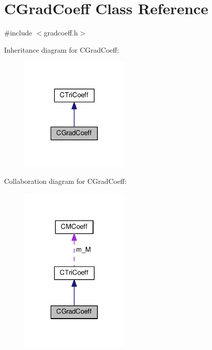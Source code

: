 \hypertarget{classCGradCoeff}{\section{C\-Grad\-Coeff Class Reference}
\label{classCGradCoeff}
}


{\ttfamily \#include $<$gradcoeff.\-h$>$}



Inheritance diagram for C\-Grad\-Coeff\-:
\nopagebreak
\begin{figure}[H]
\begin{center}
\leavevmode
\includegraphics[width=148pt]{classCGradCoeff__inherit__graph}
\end{center}
\end{figure}


Collaboration diagram for C\-Grad\-Coeff\-:
\nopagebreak
\begin{figure}[H]
\begin{center}
\leavevmode
\includegraphics[width=148pt]{classCGradCoeff__coll__graph}
\end{center}
\end{figure}
